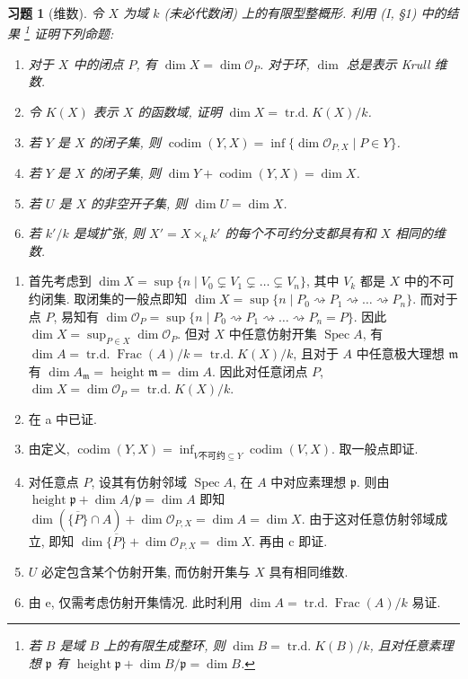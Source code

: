 \documentclass{article}
\makeatletter
\theoremstyle{exercise}
\newtheorem{exercise}{习题}[section]
\newenvironment{proofc}{\proof}{\endproof}
\def\printfootnotes{}
\def\gp{\mathfrak{p}}
\def\gm{\mathfrak{m}}
\def\sO{\mathcal{O}}
\def\spto{\rightsquigarrow}
\def\Spec{\operatorname{Spec}}
\def\dim{\operatorname{dim}}
\def\codim{\operatorname{codim}}
\def\height{\operatorname{height}}
\def\Frac{\operatorname{Frac}}
\def\trd{\operatorname{tr.d.}}
\def\clearfootnotes{\def\@printfootnotes{}}
\makeatother
\begin{document}
\begin{exercise}[维数]
  令 $X$ 为域 $k$ (未必代数闭) 上的有限型整概形. 利用 (I, §1) 中的结果%
  \footnote{若 $B$ 是域 $B$ 上的有限生成整环, 则 $\dim B = \trd K(B) / k$,
    且对任意素理想 $\gp$ 有 $\height \gp + \dim B / \gp = \dim B$.}%
  证明下列命题:
  \begin{enumerate}[label={(\alph*)}]
    \item 对于 $X$ 中的闭点 $P$, 有 $\dim X = \dim \sO_P$. 对于环, $\dim$ 总是表示 Krull 维数.
    \item 令 $K(X)$ 表示 $X$ 的函数域, 证明 $\dim X = \trd K(X) / k$.
    \item 若 $Y$ 是 $X$ 的闭子集, 则 $\codim(Y, X) = \inf \{ \dim \sO_{P, X} \mid P \in Y \}$.
    \item 若 $Y$ 是 $X$ 的闭子集, 则 $\dim Y + \codim(Y, X) = \dim X$.
    \item 若 $U$ 是 $X$ 的非空开子集, 则 $\dim U = \dim X$.
    \item 若 $k' / k$ 是域扩张, 则 $X' = X \times_k k'$ 的每个不可约分支都具有和 $X$ 相同的维数.
  \end{enumerate}
\end{exercise}
\printfootnotes
\clearfootnotes

\begin{proofc}
  \begin{enumerate}[label={(\alph*)}]
    \item 首先考虑到 $\dim X = \sup \{ n \mid V_0 \subsetneq V_1 \subsetneq \dots \subsetneq V_n \}$,
          其中 $V_k$ 都是 $X$ 中的不可约闭集.
          取闭集的一般点即知 $\dim X = \sup \{ n \mid P_0 \spto P_1 \spto \dots \spto P_n \}$.
          而对于点 $P$, 易知有 $\dim \sO_P = \sup \{ n \mid P_0 \spto P_1 \spto \dots \spto P_n = P \}$.
          因此 $\dim X = \sup_{P \in X} \dim \sO_P$.
          但对 $X$ 中任意仿射开集 $\Spec A$, 有 $\dim A = \trd \Frac(A) / k = \trd K(X) / k$,
          且对于 $A$ 中任意极大理想 $\gm$ 有 $\dim A_{\gm} = \height \gm = \dim A$.
          因此对任意闭点 $P$, $\dim X = \dim \sO_P = \trd K(X) / k$.
    \item 在 a 中已证.
    \item 由定义, $\codim(Y, X) = \inf_{V \text{不可约} \subseteq Y} \codim(V, X)$.
          取一般点即证.
    \item 对任意点 $P$, 设其有仿射邻域 $\Spec A$, 在 $A$ 中对应素理想 $\gp$.
          则由 $\height \gp + \dim A / \gp = \dim A$ 即知
          $\dim (\overline{\{P\}} \cap A) + \dim \sO_{P, X} = \dim A = \dim X$.
          由于这对任意仿射邻域成立, 即知 $\dim \overline{\{P\}} + \dim \sO_{P, X} = \dim X$.
          再由 c 即证.
    \item $U$ 必定包含某个仿射开集, 而仿射开集与 $X$ 具有相同维数.
    \item 由 e, 仅需考虑仿射开集情况.
          此时利用 $\dim A = \trd \Frac(A) / k$ 易证.
          \qedhere
  \end{enumerate}
\end{proofc}
\end{document}

